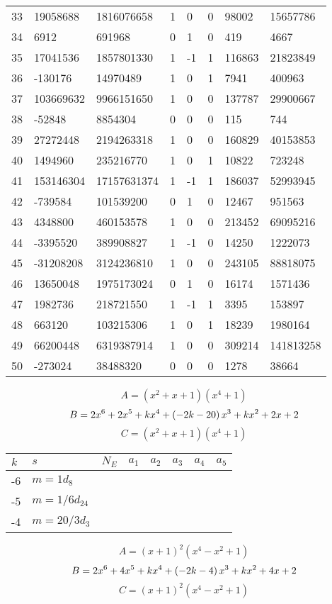 \documentclass{amsart}
\begin{document}
\begin{longtable}{|l|l|l|lllll|}
33&19058688&1816076658&1&0&0&98002&15657786\\
34&6912&691968&0&1&0&419&4667\\
35&17041536&1857801330&1&-1&1&116863&21823849\\
36&-130176&14970489&1&0&1&7941&400963\\
37&103669632&9966151650&1&0&0&137787&29900667\\
38&-52848&8854304&0&0&0&115&744\\
39&27272448&2194263318&1&0&0&160829&40153853\\
40&1494960&235216770&1&0&1&10822&723248\\
41&153146304&17157631374&1&-1&1&186037&52993945\\
42&-739584&101539200&0&1&0&12467&951563\\
43&4348800&460153578&1&0&0&213452&69095216\\
44&-3395520&389908827&1&-1&0&14250&1222073\\
45&-31208208&3124236810&1&0&0&243105&88818075\\
46&13650048&1975173024&0&1&0&16174&1571436\\
47&1982736&218721550&1&-1&1&3395&153897\\
48&663120&103215306&1&0&1&18239&1980164\\
49&66200448&6319387914&1&0&0&309214&141813258\\
50&-273024&38488320&0&0&0&1278&38664\\
\hline
\end{longtable}
$$A=(x^2
 + x
 + 1)(x^4
 + 1)$$
$$B=2\*x^6
 + 2\*x^5
 + k\*x^4
 + \left(-2\*k
 - 20\right) \*x^3
 + k\*x^2
 + 2\*x
 + 2$$
$$C=(x^2
 + x
 + 1)(x^4
 + 1)$$
\begin{longtable}{|l|l|l|lllll|}
\hline
$k$ & $s$ & $N_E$ & $a_1$ & $a_2$ & $a_3$ & $a_4$ & $a_5$\\
\hline
-6&$m=1d_{8}$&&\multicolumn{5}{c|}{}\\
-5&$m=1/6d_{24}$&&\multicolumn{5}{c|}{}\\
-4&$m=20/3d_{3}$&&\multicolumn{5}{c|}{}\\
\hline
\end{longtable}
$$A=(x
 + 1)^{2}(x^4
 - x^2
 + 1)$$
$$B=2\*x^6
 + 4\*x^5
 + k\*x^4
 + \left(-2\*k
 - 4\right) \*x^3
 + k\*x^2
 + 4\*x
 + 2$$
$$C=(x
 + 1)^{2}(x^4
 - x^2
 + 1)$$
\end{document}

